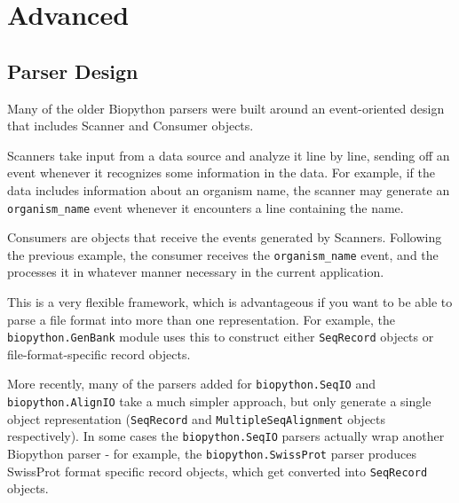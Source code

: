 \chapter{Advanced}
\label{chapter:advanced}

\section{Parser Design}

Many of the older Biopython parsers were built around an event-oriented
design that includes Scanner and Consumer objects.

Scanners take input from a data source and analyze it line by line,
sending off an event whenever it recognizes some information in the
data.  For example, if the data includes information about an organism
name, the scanner may generate an \verb|organism_name| event whenever it
encounters a line containing the name.

Consumers are objects that receive the events generated by Scanners.
Following the previous example, the consumer receives the
\verb|organism_name| event, and the processes it in whatever manner
necessary in the current application.

This is a very flexible framework, which is advantageous if you want to
be able to parse a file format into more than one representation.  For
example, the \verb|biopython.GenBank| module uses this to construct either
\verb|SeqRecord| objects or file-format-specific record objects.

More recently, many of the parsers added for \verb|biopython.SeqIO| and
\verb|biopython.AlignIO| take a much simpler approach, but only generate a
single object representation (\verb|SeqRecord| and
\verb|MultipleSeqAlignment| objects respectively). In some cases the
\verb|biopython.SeqIO| parsers actually wrap
another Biopython parser - for example, the \verb|biopython.SwissProt| parser
produces SwissProt format specific record objects, which get converted
into \verb|SeqRecord| objects.
